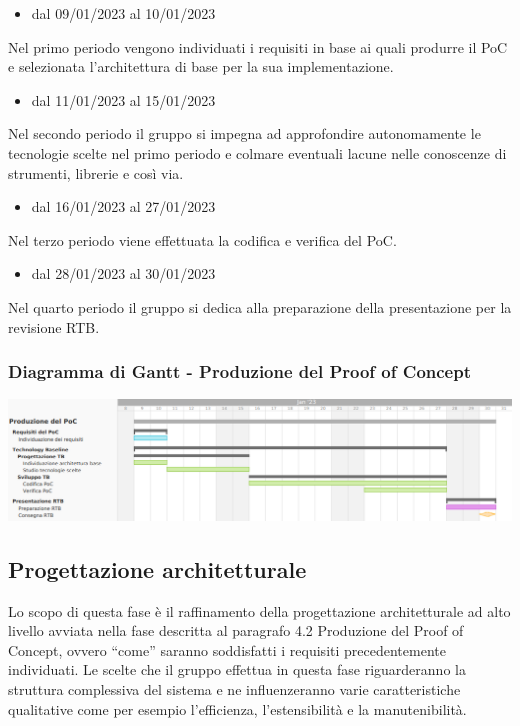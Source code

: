 \begin{itemize}
    \item dal 09/01/2023 al 10/01/2023
\end{itemize}
Nel primo periodo vengono individuati i requisiti in base ai quali produrre il PoC e selezionata l’architettura di base per la sua implementazione.

\begin{itemize}
    \item dal 11/01/2023 al 15/01/2023
\end{itemize}
Nel secondo periodo il gruppo si impegna ad approfondire autonomamente le tecnologie scelte nel primo periodo e colmare eventuali lacune nelle conoscenze di strumenti, librerie e così via.

\begin{itemize}
    \item dal 16/01/2023 al 27/01/2023
\end{itemize}
Nel terzo periodo viene effettuata la codifica e verifica del PoC.

\begin{itemize}
    \item dal 28/01/2023 al 30/01/2023
\end{itemize}
Nel quarto periodo il gruppo si dedica alla preparazione della presentazione per la revisione RTB.

\subsubsection{Diagramma di Gantt - Produzione del Proof of Concept}
\includegraphics[width=\textwidth]{src/img/4_produzione.png}\\

\subsection{Progettazione architetturale}
Lo scopo di questa fase è il raffinamento della progettazione architetturale ad alto livello avviata nella fase descritta al paragrafo 4.2 Produzione del Proof of Concept, ovvero “come” saranno soddisfatti i requisiti precedentemente individuati.
Le scelte che il gruppo effettua in questa fase riguarderanno la struttura complessiva del sistema e ne influenzeranno varie caratteristiche qualitative come per esempio l’efficienza, l’estensibilità e la manutenibilità.

